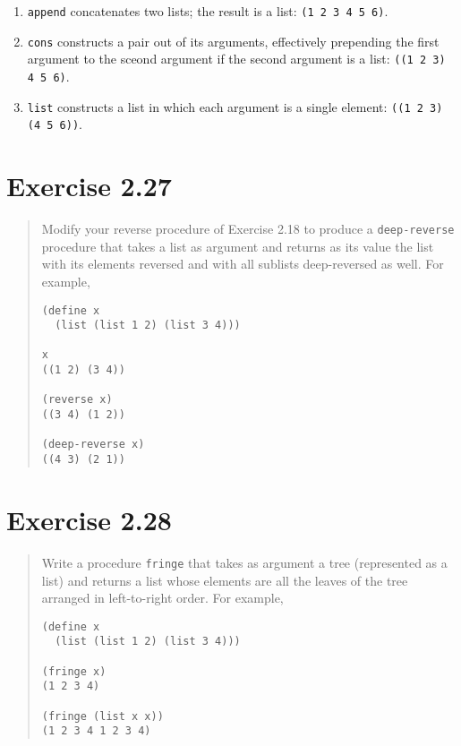 \documentclass{article}
\begin{document}
\begin{enumerate}
    \item \texttt{append} concatenates two lists; the result is a list:
        \texttt{(1 2 3 4 5 6)}.
    \item \texttt{cons} constructs a pair out of its arguments, effectively
        prepending the first argument to the sceond argument if the second
        argument is a list: \texttt{((1 2 3) 4 5 6)}.
    \item \texttt{list} constructs a list in which each argument is a single
        element: \texttt{((1 2 3) (4 5 6))}.
\end{enumerate}

\section{Exercise 2.27}
\begin{quote}
    Modify your reverse procedure of Exercise 2.18 to produce a
    \texttt{deep-reverse} procedure that takes a list as argument and returns
    as its value the list with its elements reversed and with all sublists
    deep-reversed as well. For example,
    \begin{lstlisting}
(define x
  (list (list 1 2) (list 3 4)))

x
((1 2) (3 4))

(reverse x)
((3 4) (1 2))

(deep-reverse x)
((4 3) (2 1))
    \end{lstlisting}
\end{quote}



\section{Exercise 2.28}
\begin{quote}
    Write a procedure \texttt{fringe} that takes as argument a tree
    (represented as a list) and returns a list whose elements are all the
    leaves of the tree arranged in left-to-right order. For example,
    \begin{lstlisting}
(define x
  (list (list 1 2) (list 3 4)))

(fringe x)
(1 2 3 4)

(fringe (list x x))
(1 2 3 4 1 2 3 4)
    \end{lstlisting}
\end{quote}
\end{document}
